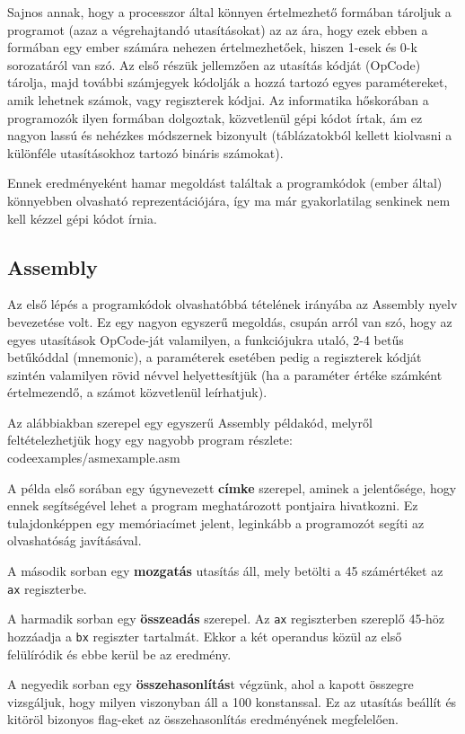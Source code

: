 Sajnos annak, hogy a processzor által könnyen értelmezhető formában tároljuk a programot (azaz a végrehajtandó utasításokat) az az ára, hogy ezek ebben a formában egy ember számára nehezen értelmezhetőek, hiszen 1-esek és 0-k sorozatáról van szó. Az első részük jellemzően az utasítás kódját (OpCode) tárolja, majd további számjegyek kódolják a hozzá tartozó egyes paramétereket, amik lehetnek számok, vagy regiszterek kódjai. Az informatika hőskorában a programozók ilyen formában dolgoztak, közvetlenül gépi kódot írtak, ám ez nagyon lassú és nehézkes módszernek bizonyult (táblázatokból kellett kiolvasni a különféle utasításokhoz tartozó bináris számokat).

Ennek eredményeként hamar megoldást találtak a programkódok (ember által) könnyebben olvasható reprezentációjára, így ma már gyakorlatilag senkinek nem kell kézzel gépi kódot írnia.

\subsection{Assembly} 

Az első lépés a programkódok olvashatóbbá tételének irányába az Assembly nyelv bevezetése volt. Ez egy nagyon egyszerű megoldás, csupán arról van szó, hogy az egyes utasítások OpCode-ját valamilyen, a funkciójukra utaló, 2-4 betűs betűkóddal (mnemonic), a paraméterek esetében pedig a regiszterek kódját szintén valamilyen rövid névvel helyettesítjük (ha a paraméter értéke számként értelmezendő, a számot közvetlenül leírhatjuk).

Az alábbiakban szerepel egy egyszerű Assembly példakód, melyről feltételezhetjük hogy egy nagyobb program részlete:
\asmlisting
 {codeexamples/asmexample.asm}

A példa első sorában egy úgynevezett \textbf{címke} szerepel, aminek a jelentősége, hogy ennek segítségével lehet a program meghatározott pontjaira hivatkozni. Ez tulajdonképpen egy memóriacímet jelent, leginkább a programozót segíti az olvashatóság javításával.


A második sorban egy \textbf{mozgatás} utasítás áll, mely betölti a 45 számértéket az \texttt{ax} regiszterbe.


A harmadik sorban egy \textbf{összeadás} szerepel. Az \texttt{ax} regiszterben szereplő 45-höz hozzáadja a \texttt{bx} regiszter tartalmát. Ekkor a két operandus közül az első felülíródik és ebbe kerül be az eredmény.

A negyedik sorban egy \textbf{összehasonlítás}t végzünk, ahol a kapott összegre vizsgáljuk, hogy milyen viszonyban áll a 100 konstanssal. Ez az utasítás beállít és kitöröl bizonyos flag-eket az összehasonlítás eredményének megfelelően. 
 
